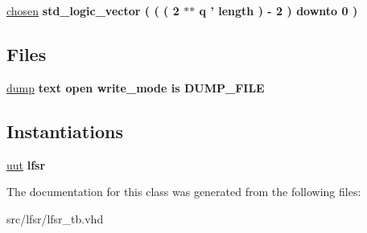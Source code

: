\begin{DoxyCompactItemize}
\item 
\hypertarget{classlfsr__tb_1_1sim_a8af801aefd2ca7b2d72e2dad0b151d5d}{\hyperlink{classlfsr__tb_1_1sim_a8af801aefd2ca7b2d72e2dad0b151d5d}{chosen} {\bfseries \textcolor{comment}{std\-\_\-logic\-\_\-vector}\textcolor{vhdlchar}{ }\textcolor{vhdlchar}{(}\textcolor{vhdlchar}{ }\textcolor{vhdlchar}{ }\textcolor{vhdlchar}{(}\textcolor{vhdlchar}{ }\textcolor{vhdlchar}{(}\textcolor{vhdlchar}{ } \textcolor{vhdldigit}{2} \textcolor{vhdlchar}{ }\textcolor{vhdlchar}{$\ast$}\textcolor{vhdlchar}{$\ast$}\textcolor{vhdlchar}{ }\textcolor{vhdlchar}{q}\textcolor{vhdlchar}{ }\textcolor{vhdlchar}{'}\textcolor{vhdlchar}{ }\textcolor{vhdlchar}{ }\textcolor{vhdlchar}{length}\textcolor{vhdlchar}{ }\textcolor{vhdlchar}{)}\textcolor{vhdlchar}{ }\textcolor{vhdlchar}{ }\textcolor{vhdlchar}{-\/}\textcolor{vhdlchar}{ } \textcolor{vhdldigit}{2} \textcolor{vhdlchar}{ }\textcolor{vhdlchar}{)}\textcolor{vhdlchar}{ }\textcolor{vhdlchar}{ }\textcolor{vhdlchar}{ }\textcolor{vhdlchar}{ }\textcolor{vhdlkeyword}{downto}\textcolor{vhdlchar}{ }\textcolor{vhdlchar}{ }\textcolor{vhdlchar}{ } \textcolor{vhdldigit}{0} \textcolor{vhdlchar}{ }\textcolor{vhdlchar}{)}\textcolor{vhdlchar}{ }} }\label{classlfsr__tb_1_1sim_a8af801aefd2ca7b2d72e2dad0b151d5d}

\end{DoxyCompactItemize}
\subsection*{Files}
 \begin{DoxyCompactItemize}
\item 
\hypertarget{classlfsr__tb_1_1sim_a0fcbb6d242fd50c6a09138675a054a78}{\hyperlink{classlfsr__tb_1_1sim_a0fcbb6d242fd50c6a09138675a054a78}{dump} {\bfseries \textcolor{vhdlchar}{text}\textcolor{vhdlchar}{ }\textcolor{vhdlkeyword}{open}\textcolor{vhdlchar}{ }\textcolor{vhdlchar}{write\-\_\-mode}\textcolor{vhdlchar}{ }\textcolor{vhdlkeyword}{is}\textcolor{vhdlchar}{ }\textcolor{vhdlchar}{D\-U\-M\-P\-\_\-\-F\-I\-L\-E}\textcolor{vhdlchar}{ }} }\label{classlfsr__tb_1_1sim_a0fcbb6d242fd50c6a09138675a054a78}

\end{DoxyCompactItemize}
\subsection*{Instantiations}
 \begin{DoxyCompactItemize}
\item 
\hypertarget{classlfsr__tb_1_1sim_a1619316ad715601eb5d3559db829ac05}{\hyperlink{classlfsr__tb_1_1sim_a1619316ad715601eb5d3559db829ac05}{uut}  {\bfseries lfsr}   }\label{classlfsr__tb_1_1sim_a1619316ad715601eb5d3559db829ac05}

\end{DoxyCompactItemize}


The documentation for this class was generated from the following files\-:\begin{DoxyCompactItemize}
\item 
src/lfsr/lfsr\-\_\-tb.\-vhd\end{DoxyCompactItemize}
